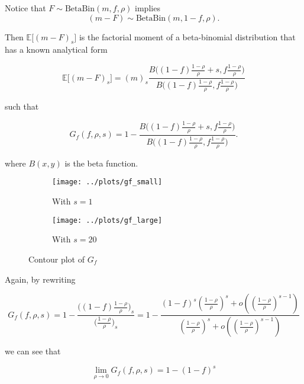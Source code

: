 \documentclass[american, abstract=on]{scrartcl}
\newcommand{\E}{\mathbb{E}}
\newcommand{\Beta}{\text{Beta}}
\newcommand{\Bin}{\text{Bin}}
\begin{document}
Notice that $F \sim \Beta\Bin(m, f, \rho)$ implies \begin{equation}(m - F) \sim \Beta\Bin(m, 1 - f, \rho).\end{equation}

Then $\E\big[(m - F)_s\big]$ is the factorial moment of a beta-binomial distribution that has a known analytical form

\begin{equation}
    \E\big[(m - F)_s\big] = (m)_s \frac{B\Big( (1 - f) \frac{1 - \rho}{\rho} + s, f \frac{1 - \rho}{\rho} \Big)}{B\Big( (1 - f) \frac{1 - \rho}{\rho}, f \frac{1 - \rho}{\rho} \Big)}
\end{equation}

such that

\begin{equation}
    G_f(f, \rho, s) = 1 - \frac{B\Big( (1 - f) \frac{1 - \rho}{\rho} + s, f \frac{1 - \rho}{\rho} \Big)}{B\Big( (1 - f) \frac{1 - \rho}{\rho}, f \frac{1 - \rho}{\rho} \Big)}.
\end{equation}

where $B(x, y)$ is the beta function.

\begin{figure}[H]
    \centering
    \begin{subfigure}{.5\textwidth}
      \centering
      \texttt{[image: ../plots/gf\_small]} 
      \caption{With $s = 1$}
      \label{fig:gf:small}  
    \end{subfigure}%
    \begin{subfigure}{.5\textwidth}
      \centering
      \texttt{[image: ../plots/gf\_large]}       
      \caption{With $s = 20$}
      \label{fig:gf:large}
    \end{subfigure}
    \caption{Contour plot of $G_f$}
    \label{fig:gf}
  \end{figure}

Again, by rewriting

\begin{equation}
    G_f(f, \rho, s) = 1 - \frac{\Big( (1-f) \frac{1 - \rho}{\rho} \Big)_s}{\Big( \frac{1 - \rho}{\rho} \Big)_s} = 1 - \frac{(1 - f)^s \left(\frac{1 - \rho}{\rho}\right)^s + o\left(\left(\frac{1 - \rho}{\rho}\right)^{s - 1} \right) }{\left(\frac{1 - \rho}{\rho}\right)^s + o\left(\left(\frac{1 - \rho}{\rho}\right)^{s - 1} \right)}
\end{equation}

we can see that

\begin{equation}
    \lim_{\rho \rightarrow 0} G_f(f, \rho, s) = 1 - (1 - f)^s
\end{equation}
\end{document}
